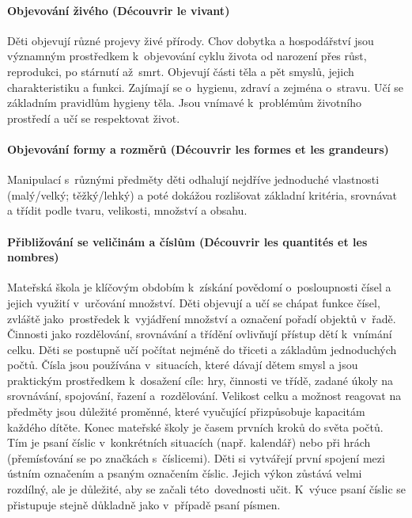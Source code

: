 			\paragraph{Objevování živého (Découvrir le vivant)} 
				Děti objevují různé projevy živé přírody. Chov dobytka a hospodářství jsou významným prostředkem k objevování cyklu života od narození přes růst, reprodukci, po stárnutí až smrt.
				Objevují části těla a pět smyslů, jejich charakteristiku a funkci. Zajímají se o~hygienu, zdraví a zejména o~stravu. Učí se základním pravidlům hygieny těla. 
				Jsou vnímavé k problémům životního prostředí a učí se respektovat život. 
			\paragraph{Objevování formy a rozměrů (Découvrir les formes et les grandeurs)}
				Manipulací s různými předměty děti odhalují nejdříve jednoduché vlastnosti (malý/velký; těžký/lehký) a poté dokážou rozlišovat základní kritéria, srovnávat a třídit podle tvaru, velikosti, množství a obsahu.
			\paragraph{Přibližování se veličinám a číslům (Découvrir les quantités et les nombres)}
				Mateřská škola je klíčovým obdobím k získání povědomí o~posloupnosti čísel a jejich využití v určování množství. Děti objevují a učí se chápat funkce čísel, zvláště jako prostředek k~vyjádření množství a označení pořadí objektů v řadě.
				Činnosti jako rozdělování, srovnávání a třídění ovlivňují přístup dětí k vnímání celku. Děti se postupně učí počítat nejméně do třiceti a základům jednoduchých počtů.
				Čísla jsou používána v situacích, které dávají dětem smysl a jsou praktickým prostředkem k dosažení cíle: hry, činnosti ve třídě, zadané úkoly na srovnávání, spojování, řazení a rozdělování. Velikost celku a možnost reagovat na předměty jsou důležité proměnné, které vyučující přizpůsobuje kapacitám každého dítěte. 
				Konec mateřské školy je časem prvních kroků do světa počtů. 
				Tím je psaní číslic v konkrétních situacích (např. kalendář) nebo při hrách (přemísťování se po značkách s číslicemi). Děti si vytvářejí první spojení mezi ústním označením a psaným označením číslic. Jejich výkon zůstává velmi rozdílný, ale je důležité, aby se začali této dovednosti učit. K výuce psaní číslic se přistupuje stejně důkladně jako v případě psaní písmen.
